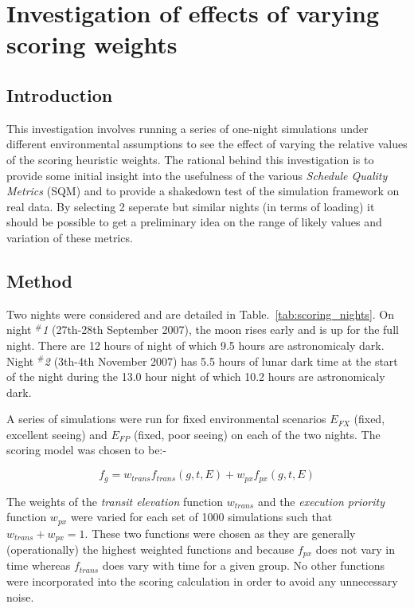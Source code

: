 \section{Investigation of effects of varying scoring weights}
\label{sect:exp_scoring}
\subsection{Introduction}

This investigation involves running a series of one-night simulations under different environmental assumptions to see the effect of varying the relative values of the scoring heuristic weights. The rational behind this investigation is to provide some initial insight into the usefulness of the various \emph{Schedule Quality Metrics} (SQM) and to provide a shakedown test of the simulation framework on real data. By selecting 2 seperate but similar nights (in terms of loading) it should be possible to get a preliminary idea on the range of likely values and variation of these metrics.


\subsection{Method}
Two nights were considered and are detailed in Table.~\ref{tab:scoring_nights}. On night \emph{$^\#$1} (27th-28th September 2007), the moon rises early and is up for the full night. There are  12 hours of night of which 9.5 hours are astronomicaly dark. Night \emph{$^\#$2} (3th-4th November 2007) has 5.5 hours of lunar dark time at the start of the night during the 13.0 hour night of which 10.2 hours are astronomicaly dark.

 A series of simulations were run for fixed environmental scenarios $E_{FX}$ (fixed, excellent seeing) and $E_{FP}$ (fixed, poor seeing) on each of the two nights. The scoring model was chosen to be:-

\begin{equation}
\label{eq:two_score}
  f_g = w_{trans} f_{trans}(g,t,E) + w_{px} f_{px}(g,t,E)
\end{equation}

The weights of the \emph{transit elevation} function $w_{trans}$ and the \emph{execution priority} function $w_{px}$ were varied for each set of 1000 simulations such that $w_{trans} + w_{px} = 1$. These two functions were chosen as they are generally (operationally) the highest weighted functions and because $f_{px}$ does not vary in time whereas $f_{trans}$ does vary with time for a given group. No other functions were incorporated into the scoring calculation in order to avoid any unnecessary noise.

